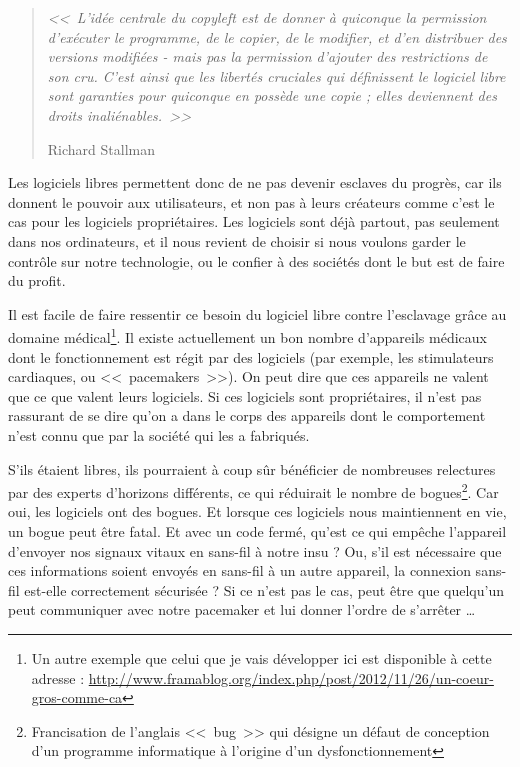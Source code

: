 \begin{quotation}
\begin{flushright}
\textit{<<~L'idée centrale du copyleft est de donner à quiconque la permission d'exécuter le programme, de le copier, de le modifier, et d'en distribuer des versions modifiées - mais pas la permission d'ajouter des restrictions de son cru. C'est ainsi que les libertés cruciales qui définissent le logiciel libre sont garanties pour quiconque en possède une copie ; elles deviennent des droits inaliénables.~>>}
\begin{flushright}Richard Stallman\end{flushright}
\end{flushright}
\end{quotation}

Les logiciels libres permettent donc de ne pas devenir esclaves du progrès, car ils donnent le pouvoir aux utilisateurs, et non pas à leurs créateurs comme c'est le cas pour les logiciels propriétaires.
Les logiciels sont déjà partout, pas seulement dans nos ordinateurs, et il nous revient de choisir si nous voulons garder le contrôle sur notre technologie, ou le confier à des sociétés dont le but est de faire du profit.

Il est facile de faire ressentir ce besoin du logiciel libre contre l'esclavage grâce au domaine médical\footnote{Un autre exemple que celui que je vais développer ici est disponible à cette adresse : \url{http://www.framablog.org/index.php/post/2012/11/26/un-coeur-gros-comme-ca}}.
Il existe actuellement un bon nombre d'appareils médicaux dont le fonctionnement est régit par des logiciels (par exemple, les stimulateurs cardiaques, ou <<~pacemakers~>>).
On peut dire que ces appareils ne valent que ce que valent leurs logiciels.
Si ces logiciels sont propriétaires, il n'est pas rassurant de se dire qu'on a dans le corps des appareils dont le comportement n'est connu que par la société qui les a fabriqués.

S'ils étaient libres, ils pourraient à coup sûr bénéficier de nombreuses relectures par des experts d'horizons différents, ce qui réduirait le nombre de bogues\footnote{Francisation de l'anglais <<~bug~>> qui désigne un défaut de conception d'un programme informatique à l'origine d'un dysfonctionnement}.
Car oui, les logiciels ont des bogues.
Et lorsque ces logiciels nous maintiennent en vie, un bogue peut être fatal.
Et avec un code fermé, qu'est ce qui empêche l'appareil d'envoyer nos signaux vitaux en sans-fil à notre insu ?
Ou, s'il est nécessaire que ces informations soient envoyés en sans-fil à un autre appareil, la connexion sans-fil est-elle correctement sécurisée ?
Si ce n'est pas le cas, peut être que quelqu'un peut communiquer avec notre pacemaker et lui donner l'ordre de s'arrêter \dots{}

